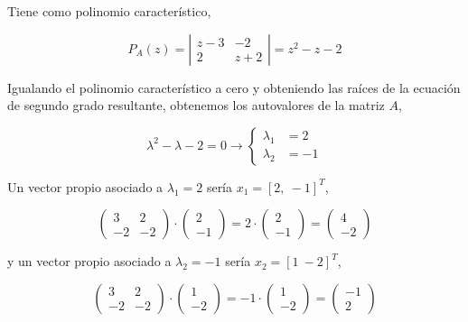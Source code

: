 \begin{paracol}{2}
Tiene como polinomio característico,
\end{paracol}
\begin{equation*}
P_A(z)=\left\vert\begin{matrix}
z-3& -2\\
2& z+2 
\end{matrix} \right\vert=z^2-z-2
\end{equation*}
\begin{paracol}{2}
Igualando el polinomio característico a cero y obteniendo las raíces de la ecuación de segundo grado resultante, obtenemos los autovalores de la matriz $A$,
\end{paracol}
\begin{equation*}
\lambda^2-\lambda-2=0 \rightarrow \left\{ 
\begin{aligned}
\lambda_1&=2\\
\lambda_2&=-1
\end{aligned}
\right.
\end{equation*}
\begin{paracol}{2}
Un vector propio asociado a $\lambda_1=2$ sería $x_1=[2,\  -1]^T$,
\end{paracol}
\begin{equation*}
\begin{pmatrix}
3& 2\\
-2& -2
\end{pmatrix}\cdot \begin{pmatrix}
2\\
-1
\end{pmatrix}=2\cdot \begin{pmatrix}
2\\
-1
\end{pmatrix} =\begin{pmatrix}
4\\
-2
\end{pmatrix} 
\end{equation*}
\begin{paracol}{2}
y un vector propio asociado a $\lambda_2=-1$ sería $x_2=[1\ -2]^T$,
\end{paracol}
\begin{equation*}
\begin{pmatrix}
3& 2\\
-2& -2
\end{pmatrix}\cdot \begin{pmatrix}
1\\
-2
\end{pmatrix}=-1\cdot \begin{pmatrix}
1\\
-2
\end{pmatrix} =\begin{pmatrix}
-1\\
2
\end{pmatrix} 
\end{equation*}
